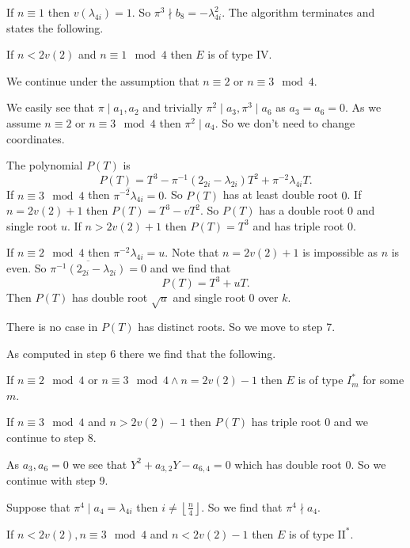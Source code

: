 If $n \equiv 1$ then $v(\lambda_{4i}) = 1$. So $\pi^3 \nmid b_8 = - \lambda_{4i}^2$. 
The algorithm terminates and states the following. 
\begin{tateconclusion}
	If $n < 2v(2)$ and $n \equiv 1 \mod 4$ then $E$ is of type  $\mathrm {IV}$. 
\end{tateconclusion}
We continue under the assumption that $n \equiv 2$ or $n \equiv 3 \mod 4$. 

We easily see that $\pi \mid a_1, a_2$ and trivially $\pi^2 \mid a_3, \pi^3 \mid a_6$ as $a_3 = a_6 = 0$. 
As we assume $n \equiv 2$ or $n \equiv 3 \mod 4$ then $\pi^2 \mid a_4$. 
So we don't need to change coordinates. 

The polynomial $P(T)$ is \[
	P(T) = T^3  -\pi^{-1}(2_{2i} - \lambda_{2i})T^2 + \pi^{-2}\lambda_{4i} T
.\] 
If $n \equiv 3 \mod 4$ then $\overline{\pi^{-2} \lambda_{4i}} = 0$. 
So $P(T)$ has at least double root $0$.
If $n = 2v(2) + 1$ then  $P(T) = T^3 - vT^2$. So $P(T)$ has a double root $0$ and single root $u$. 
If $n > 2v(2) + 1$ then $P(T) = T^3$ and has triple root $0$. 

If $n \equiv 2 \mod 4$ then $\pi^{-2} \lambda_{4i} = u$. 
Note that $n = 2v(2) +1 $ is impossible as $n$ is even. So $\overline{\pi^{-1} (2_{2i} - \lambda_{2i})} = 0$ and we find that \[
	P(T) = T^3 + u T
.\] 
Then $P(T)$ has double root $\sqrt{u} $ and single root $0$ over $k$.

There is no case in $P(T)$ has distinct roots. So we move to step 7.

As computed in step 6 there we find that the following. 
\begin{tateconclusion}
	If $n \equiv 2 \mod 4$ or $n \equiv 3 \mod 4 \wedge n = 2v(2) - 1$ then $E$ is of type $I_m^*$ for some $m$. 
\end{tateconclusion}
If  $n \equiv 3 \mod 4$ and $n > 2v(2) - 1$ then $P(T)$ has triple root $0$ and we continue to step 8.

As $a_3, a_6 = 0$ we see that $Y^2 + a_{3,2} Y - a_{6, 4} = 0$ which has double root $0$. 
So we continue with step 9. 

Suppose that $ \pi^{4} \mid a_4 = \lambda_{4i}$ then $i \ne \left\lfloor \frac{n}{4} \right\rfloor$.
So we find that $\pi^{4} \nmid a_4$. 
\begin{tateconclusion}
	If $n < 2v(2), n\equiv 3 \mod 4$ and $n < 2v(2) - 1$ then $E$ is of type $\mathrm{II}^*$. 
\end{tateconclusion}

